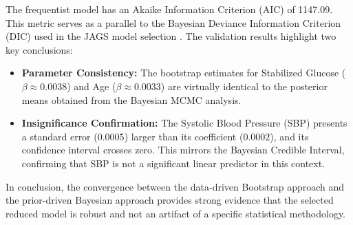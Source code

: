 The frequentist model has an Akaike Information Criterion (AIC) of 1147.09. This metric serves as a parallel to the Bayesian Deviance Information Criterion (DIC) used in the JAGS model selection \cite{spiegelhalter2002}. The validation results highlight two key conclusions:
\begin{itemize}
	\item \textbf{Parameter Consistency:} The bootstrap estimates for Stabilized Glucose ($\beta \approx 0.0038$) and Age ($\beta \approx 0.0033$) are virtually identical to the posterior means obtained from the Bayesian MCMC analysis.
	\item \textbf{Insignificance Confirmation:} The Systolic Blood Pressure (SBP) presents a standard error ($0.0005$) larger than its coefficient ($0.0002$), and its confidence interval crosses zero. This mirrors the Bayesian Credible Interval, confirming that SBP is not a significant linear predictor in this context.
\end{itemize}
In conclusion, the convergence between the data-driven Bootstrap approach and the prior-driven Bayesian approach provides strong evidence that the selected reduced model is robust and not an artifact of a specific statistical methodology.